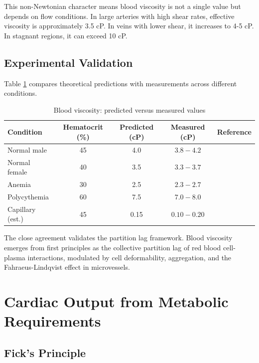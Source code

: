 \documentclass[10pt,twocolumn,a4paper]{article}
\theoremstyle{remark}
\begin{document}
This non-Newtonian character means blood viscosity is not a single value but depends on flow conditions. In large arteries with high shear rates, effective viscosity is approximately 3.5 cP. In veins with lower shear, it increases to 4-5 cP. In stagnant regions, it can exceed 10 cP.

\subsection{Experimental Validation}

Table \ref{tab:viscosity_validation} compares theoretical predictions with measurements across different conditions.

\begin{table}[h]
\centering
\caption{Blood viscosity: predicted versus measured values}
\label{tab:viscosity_validation}
\begin{tabular}{lcccc}
\toprule
\textbf{Condition} & \textbf{Hematocrit (\%)} & \textbf{Predicted (cP)} & \textbf{Measured (cP)} & \textbf{Reference} \\
\midrule
Normal male & 45 & 4.0 & $3.8-4.2$ & \cite{chien1970blood} \\
Normal female & 40 & 3.5 & $3.3-3.7$ & \cite{chien1970blood} \\
Anemia & 30 & 2.5 & $2.3-2.7$ & \cite{wells1962viscosity} \\
Polycythemia & 60 & 7.5 & $7.0-8.0$ & \cite{wells1962viscosity} \\
Capillary (est.) & 45 & 0.15 & $0.10-0.20$ & \cite{pries1994resistance} \\
\bottomrule
\end{tabular}
\end{table}

The close agreement validates the partition lag framework. Blood viscosity emerges from first principles as the collective partition lag of red blood cell-plasma interactions, modulated by cell deformability, aggregation, and the Fahraeus-Lindqvist effect in microvessels.

\section{Cardiac Output from Metabolic Requirements}
\label{sec:cardiac}

\subsection{Fick's Principle}
\end{document}
